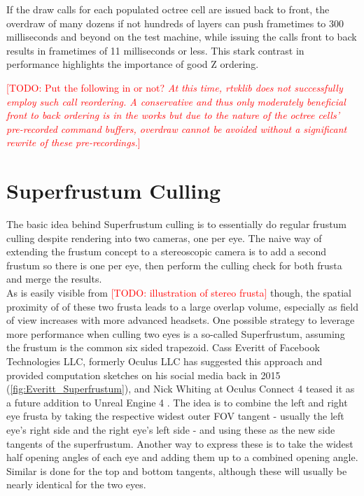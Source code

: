 If the draw calls for each populated octree cell are issued back to front, the overdraw of many dozens if not hundreds of layers can push frametimes to 300 milliseconds and beyond on the test machine, while issuing the calls front to back results in frametimes of 11 milliseconds or less. 
This stark contrast in performance highlights the importance of good Z ordering. 

\textcolor{red}{[TODO: Put the following in or not? \textit{At this time, rtvklib does not successfully employ such call reordering. A conservative and thus only moderately beneficial front to back ordering is in the works but due to the nature of the octree cells' pre-recorded command buffers, overdraw cannot be avoided without a significant rewrite of these pre-recordings.}]}

\section{Superfrustum Culling}
The basic idea behind Superfrustum culling is to essentially do regular frustum culling despite rendering into two cameras, one per eye. The naive way of extending the frustum concept to a stereoscopic camera is to add a second frustum so there is one per eye, then perform the culling check for both frusta and merge the results. \\
As is easily visible from \textcolor{red}{[TODO: illustration of stereo frusta]} though, the spatial proximity of of these two frusta leads to a large overlap volume, especially as field of view increases with more advanced headsets. One possible strategy to leverage more performance when culling two eyes is a so-called Superfrustum, assuming the frustum is the common six sided trapezoid. Cass Everitt of Facebook Technologies LLC, formerly Oculus LLC has suggested this approach and provided computation sketches on his social media back in 2015 \cite{Everitt.2015}(\autoref{fig:Everitt_Superfrustum}), and Nick Whiting at Oculus Connect 4 teased it as a future addition to Unreal Engine 4 \cite{Whiting.2017}. The idea is to combine the left and right eye frusta by taking the respective widest outer FOV tangent - usually the left eye's right side and the right eye's left side - and using these as the new side tangents of the superfrustum. Another way to express these is to take the widest half opening angles of each eye and adding them up to a combined opening angle. Similar is done for the top and bottom tangents, although these will usually be nearly identical for the two eyes. \\
